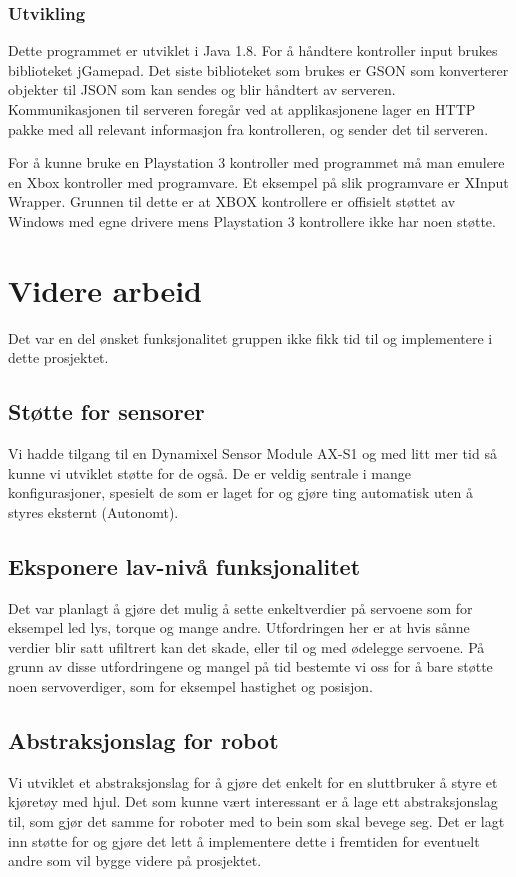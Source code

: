 \documentclass[12pt]{report}
\begin{document}
\subsection{Utvikling}
Dette programmet er utviklet i Java 1.8\cite{Java}. For å håndtere kontroller input brukes biblioteket jGamepad\cite{jGamepad}. Det siste biblioteket som brukes er GSON\cite{GSON} som konverterer objekter til JSON som kan sendes og blir håndtert av serveren. Kommunikasjonen til serveren foregår ved at applikasjonene lager en HTTP pakke med all relevant informasjon fra kontrolleren, og sender det til serveren.

For å kunne bruke en Playstation 3 kontroller med programmet må man emulere en Xbox kontroller med programvare. Et eksempel på slik programvare er XInput Wrapper\cite{XInput}. Grunnen til dette er at XBOX kontrollere er offisielt støttet av Windows med egne drivere mens Playstation 3 kontrollere ikke har noen støtte.

\clearpage

\chapter{Videre arbeid}
Det var en del ønsket funksjonalitet gruppen ikke fikk tid til og implementere i dette prosjektet.

\section{Støtte for sensorer}
Vi hadde tilgang til en Dynamixel Sensor Module AX-S1\cite{DynaSens} og med litt mer tid så kunne vi utviklet støtte for de også. De er veldig sentrale i mange konfigurasjoner, spesielt de som er laget for og gjøre ting automatisk uten å styres eksternt (Autonomt).

\section{Eksponere lav-nivå funksjonalitet}
Det var planlagt å gjøre det mulig å sette enkeltverdier på servoene som for eksempel led lys, torque og mange andre. Utfordringen her er at hvis sånne verdier blir satt ufiltrert kan det skade, eller til og med ødelegge servoene. På grunn av disse utfordringene og mangel på tid bestemte vi oss for å bare støtte noen servoverdiger, som for eksempel hastighet og posisjon.

\section{Abstraksjonslag for robot}
Vi utviklet et abstraksjonslag for å gjøre det enkelt for en sluttbruker å styre et kjøretøy med hjul. Det som kunne vært interessant er å lage ett abstraksjonslag til, som gjør det samme for roboter med to bein som skal bevege seg. Det er lagt inn støtte for og gjøre det lett å implementere dette i fremtiden for eventuelt andre som vil bygge videre på prosjektet.
\end{document}
